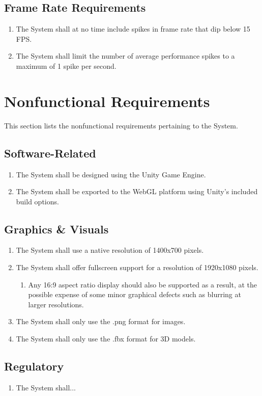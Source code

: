 \documentclass[12pt]{report}
\newenvironment{reqlist}{
	\renewcommand{\labelenumi}{\tab\thesubsection.\arabic{enumi}}
	\renewcommand{\labelenumii}{\thesubsection.\arabic{enumi}.\arabic{enumii}}
	\begin{enumerate}[itemsep = 1pt, parsep = 0pt, leftmargin = *]
}{\end{enumerate}}
\begin{document}
	\subsection{Frame Rate Requirements}
	\begin{reqlist}
		\item The System shall at no time include spikes in frame rate that dip below 15 FPS.
		\item The System shall limit the number of average performance spikes to a maximum of 1 spike per second.
	\end{reqlist}

\section{Nonfunctional Requirements}
	This section lists the nonfunctional requirements pertaining to the System. 
	\subsection{Software-Related}
		\begin{reqlist}
			\item The System shall be designed using the Unity Game Engine.
			\item The System shall be exported to the WebGL platform using Unity's included build options.
		\end{reqlist}
	\subsection{Graphics \& Visuals}
		\begin{reqlist}
			\item The System shall use a native resolution of 1400x700 pixels.
			\item The System shall offer fullscreen support for a resolution of 1920x1080 pixels.
			\begin{reqlist}
				\item Any 16:9 aspect ratio display should also be supported as a result, at the possible expense of some minor graphical defects such as blurring at larger resolutions.
			\end{reqlist}
			\item The System shall only use the .png format for images.
			\item The System shall only use the .fbx format for 3D models.
		\end{reqlist}
	\subsection{Regulatory}
		\begin{reqlist}
			\item The System shall...
		\end{reqlist}
\end{document}
